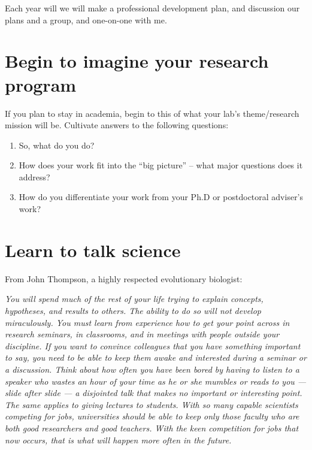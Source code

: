 \documentclass[12pt]{article}
\begin{document}
Each year will we will make a professional development plan, and
discussion our plans and a group, and one-on-one with me.

\section{Begin to imagine your research program}
\label{sec:research}

If you plan to stay in academia, begin to this of what your lab's
theme/research mission will be. Cultivate answers to the following
questions:

\begin{enumerate}
\item So, what do you do?
\item How does your work fit into the ``big picture'' -- what major
  questions does it address?
\item How do you differentiate your work from your Ph.D or
  postdoctoral adviser's work?
\end{enumerate}


\section{Learn to talk science}
\label{sec:talkScience}

From John Thompson, a highly respected evolutionary biologist:

\textit{You will spend much of the rest of your life trying to explain
  concepts, hypotheses, and results to others. The ability to do so
  will not develop miraculously. You must learn from experience how to
  get your point across in research seminars, in classrooms, and in
  meetings with people outside your discipline. If you want to
  convince colleagues that you have something important to say, you
  need to be able to keep them awake and interested during a seminar
  or a discussion. Think about how often you have been bored by having
  to listen to a speaker who wastes an hour of your time as he or she
  mumbles or reads to you --- slide after slide --- a disjointed talk that
  makes no important or interesting point. The same applies to giving
  lectures to students. With so many capable scientists competing for
  jobs, universities should be able to keep only those faculty who are
  both good researchers and good teachers. With the keen competition
  for jobs that now occurs, that is what will happen more often in the
  future.}
\end{document}
